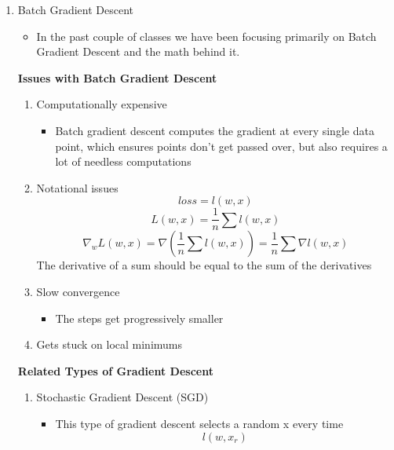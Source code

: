 \begin{enumerate}
    \item Batch Gradient Descent
    \begin{itemize}
        \item In the past couple of classes we have been focusing primarily on Batch Gradient Descent and the math behind it.
    \end{itemize} 
    \textbf{Issues with Batch Gradient Descent}
    \begin{enumerate}
        \item Computationally expensive
        \begin{itemize}
            \item Batch gradient descent computes the gradient at every single data point, which ensures points don't get passed over, but also requires a lot of needless computations
        \end{itemize} 
        \item Notational issues
        \[
        loss = l(w,x)
        \]
        \[
        L(w,x) = \frac{1}{n} \sum l(w,x)
        \]
        \[
        \nabla_w L(w,x)=\nabla (\frac{1}{n} \sum l(w,x)) = \frac{1}{n} \sum \nabla l(w,x)
        \]
        The derivative of a sum should be equal to the sum of the derivatives
        \item Slow convergence
        \begin{itemize}
            \item The steps get progressively smaller
        \end{itemize}
        \item Gets stuck on local minimums
    \end{enumerate}
    \textbf{Related Types of Gradient Descent}
    \begin{enumerate}
        \item Stochastic Gradient Descent (SGD)
        \begin{itemize}
            \item This type of gradient descent selects a random x every time
            \[
            l(w,x_r)
            \]
        \end{itemize}


\end{enumerate}
\end{enumerate}
